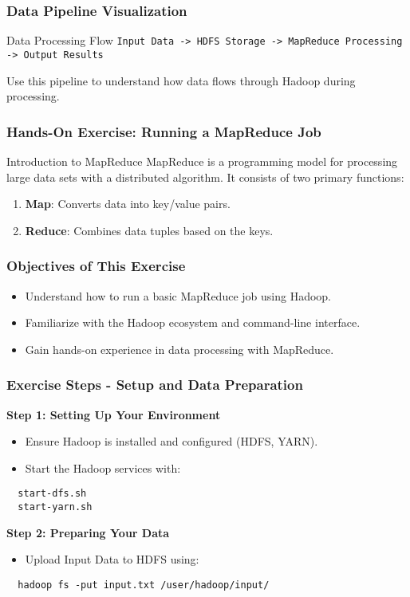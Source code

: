 \documentclass[aspectratio=169]{beamer}
\begin{document}
\begin{frame}[fragile]
  \frametitle{Data Pipeline Visualization}
  \begin{block}{Data Processing Flow}
    \texttt{Input Data -> HDFS Storage -> MapReduce Processing -> Output Results}
  \end{block}
  Use this pipeline to understand how data flows through Hadoop during processing.
\end{frame}

\begin{frame}[fragile]
  \frametitle{Hands-On Exercise: Running a MapReduce Job}
  \begin{block}{Introduction to MapReduce}
    MapReduce is a programming model for processing large data sets with a distributed algorithm. It consists of two primary functions:
    \begin{enumerate}
      \item \textbf{Map}: Converts data into key/value pairs.
      \item \textbf{Reduce}: Combines data tuples based on the keys.
    \end{enumerate}
  \end{block}
\end{frame}

\begin{frame}[fragile]
  \frametitle{Objectives of This Exercise}
  \begin{itemize}
    \item Understand how to run a basic MapReduce job using Hadoop.
    \item Familiarize with the Hadoop ecosystem and command-line interface.
    \item Gain hands-on experience in data processing with MapReduce.
  \end{itemize}
\end{frame}

\begin{frame}[fragile]
  \frametitle{Exercise Steps - Setup and Data Preparation}
  
  \textbf{Step 1: Setting Up Your Environment}
  \begin{itemize}
    \item Ensure Hadoop is installed and configured (HDFS, YARN).
    \item Start the Hadoop services with:
  \end{itemize}
  
  \begin{lstlisting}
  start-dfs.sh
  start-yarn.sh
  \end{lstlisting}

  \textbf{Step 2: Preparing Your Data}
  \begin{itemize}
    \item Upload Input Data to HDFS using:
  \end{itemize}
  
  \begin{lstlisting}
  hadoop fs -put input.txt /user/hadoop/input/
  \end{lstlisting}
\end{frame}
\end{document}
